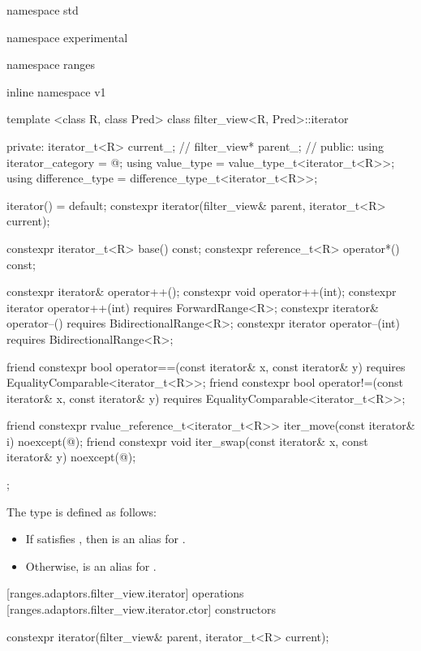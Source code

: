 %
\begin{codeblock}
namespace std { namespace experimental { namespace ranges { inline namespace v1 {
  template <class R, class Pred>
  class filter_view<R, Pred>::iterator {
  private:
    iterator_t<R> current_; // \expos
    filter_view* parent_; // \expos
  public:
    using iterator_category = @\seebelow@;
    using value_type = value_type_t<iterator_t<R>>;
    using difference_type = difference_type_t<iterator_t<R>>;

    iterator() = default;
    constexpr iterator(filter_view& parent, iterator_t<R> current);

    constexpr iterator_t<R> base() const;
    constexpr reference_t<R> operator*() const;

    constexpr iterator& operator++();
    constexpr void operator++(int);
    constexpr iterator operator++(int) requires ForwardRange<R>;
    constexpr iterator& operator--() requires BidirectionalRange<R>;
    constexpr iterator operator--(int) requires BidirectionalRange<R>;

    friend constexpr bool operator==(const iterator& x, const iterator& y)
      requires EqualityComparable<iterator_t<R>>;
    friend constexpr bool operator!=(const iterator& x, const iterator& y)
      requires EqualityComparable<iterator_t<R>>;

    friend constexpr rvalue_reference_t<iterator_t<R>> iter_move(const iterator& i)
      noexcept(@\seebelow@);
    friend constexpr void iter_swap(const iterator& x, const iterator& y)
      noexcept(@\seebelow@);
  };
}}}}
\end{codeblock}

\pnum
The type  is defined as follows:
\begin{itemize}
\item If  satisfies , then 
is an alias for .
\item Otherwise,  is an alias for
.
\end{itemize}

[ranges.adaptors.filter_view.iterator]{ operations}
[ranges.adaptors.filter_view.iterator.ctor]{ constructors}

%
\begin{itemdecl}
constexpr iterator(filter_view& parent, iterator_t<R> current);
\end{itemdecl}

